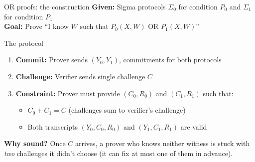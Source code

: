\ifdefined\PRESENTATION\else\PassOptionsToClass{handout}{beamer}\fi\documentclass[aspectratio=169, lualatex]{beamer}
\begin{document}
\begin{frame}{OR proofs: the construction}
	\textbf{Given:} Sigma protocols $\Sigma_0$ for condition $P_0$ and $\Sigma_1$ for condition $P_1$\\
	\textbf{Goal:} Prove ``I know $W$ such that $P_0(X,W)$ OR $P_1(X,W)$''
	\begin{block}{The protocol}
		\begin{enumerate}
			\item \textbf{Commit:} Prover sends $(Y_0, Y_1)$, commitments for both protocols
			\item \textbf{Challenge:} Verifier sends single challenge $C$
			\item \textbf{Constraint:} Prover must provide $(C_0, R_0)$ and $(C_1, R_1)$ such that:
			      \begin{itemize}
				      \item $C_0 + C_1 = C$ (challenges sum to verifier's challenge)
				      \item Both transcripts $(Y_0, C_0, R_0)$ and $(Y_1, C_1, R_1)$ are valid
			      \end{itemize}
		\end{enumerate}
	\end{block}
	\textbf{Why sound?} Once $C$ arrives, a prover who knows neither witness is stuck with \textit{two} challenges it didn't choose (it can fix at most one of them in advance).
\end{frame}
\end{document}
